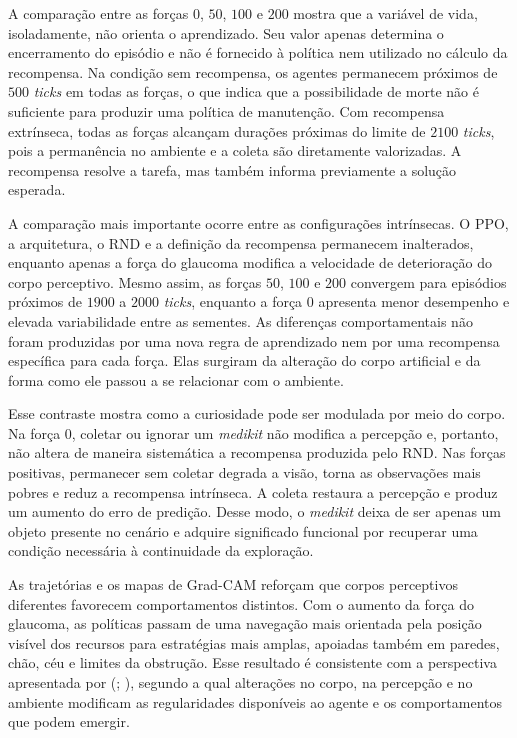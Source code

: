 A comparação entre as forças $0$, $50$, $100$ e $200$ mostra que a variável de vida, isoladamente, não orienta o aprendizado. Seu valor apenas determina o encerramento do episódio e não é fornecido à política nem utilizado no cálculo da recompensa. Na condição sem recompensa, os agentes permanecem próximos de $500$ \textit{ticks} em todas as forças, o que indica que a possibilidade de morte não é suficiente para produzir uma política de manutenção. Com recompensa extrínseca, todas as forças alcançam durações próximas do limite de $2100$ \textit{ticks}, pois a permanência no ambiente e a coleta são diretamente valorizadas. A recompensa resolve a tarefa, mas também informa previamente a solução esperada.

A comparação mais importante ocorre entre as configurações intrínsecas. O PPO, a arquitetura, o RND e a definição da recompensa permanecem inalterados, enquanto apenas a força do glaucoma modifica a velocidade de deterioração do corpo perceptivo. Mesmo assim, as forças $50$, $100$ e $200$ convergem para episódios próximos de $1900$ a $2000$ \textit{ticks}, enquanto a força $0$ apresenta menor desempenho e elevada variabilidade entre as sementes. As diferenças comportamentais não foram produzidas por uma nova regra de aprendizado nem por uma recompensa específica para cada força. Elas surgiram da alteração do corpo artificial e da forma como ele passou a se relacionar com o ambiente.

Esse contraste mostra como a curiosidade pode ser modulada por meio do corpo. Na força $0$, coletar ou ignorar um \textit{medikit} não modifica a percepção e, portanto, não altera de maneira sistemática a recompensa produzida pelo RND. Nas forças positivas, permanecer sem coletar degrada a visão, torna as observações mais pobres e reduz a recompensa intrínseca. A coleta restaura a percepção e produz um aumento do erro de predição. Desse modo, o \textit{medikit} deixa de ser apenas um objeto presente no cenário e adquire significado funcional por recuperar uma condição necessária à continuidade da exploração.

As trajetórias e os mapas de Grad-CAM reforçam que corpos perceptivos diferentes favorecem comportamentos distintos. Com o aumento da força do glaucoma, as políticas passam de uma navegação mais orientada pela posição visível dos recursos para estratégias mais amplas, apoiadas também em paredes, chão, céu e limites da obstrução. Esse resultado é consistente com a perspectiva apresentada por  (\citeyear{yuri-ambiente-rico}; \citeyear{yuri-sem-objetivo}), segundo a qual alterações no corpo, na percepção e no ambiente modificam as regularidades disponíveis ao agente e os comportamentos que podem emergir.

